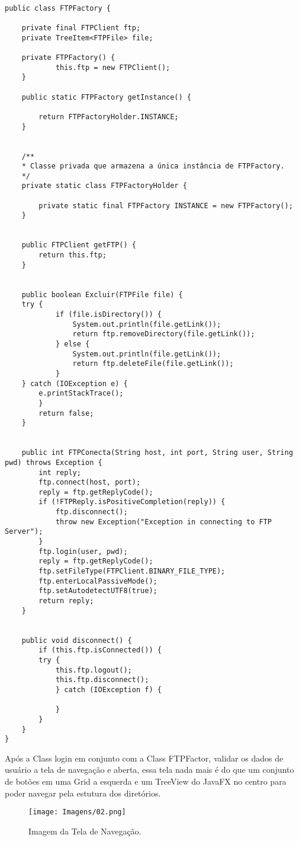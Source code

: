 \documentclass[12pt]{article}
\begin{document}
\begin{lstlisting}

public class FTPFactory {
	
	private final FTPClient ftp;
	private TreeItem<FTPFile> file;
		
	private FTPFactory() {
			this.ftp = new FTPClient();
	}
	
	public static FTPFactory getInstance() {
	
		return FTPFactoryHolder.INSTANCE;
	}


	/**
	* Classe privada que armazena a única instância de FTPFactory.
	*/
	private static class FTPFactoryHolder {
	
		private static final FTPFactory INSTANCE = new FTPFactory();
	}


	public FTPClient getFTP() {
		return this.ftp;
	}


	public boolean Excluir(FTPFile file) {
	try {
			if (file.isDirectory()) {
				System.out.println(file.getLink());
				return ftp.removeDirectory(file.getLink());
			} else {
				System.out.println(file.getLink());
				return ftp.deleteFile(file.getLink());
			}
	} catch (IOException e) {
		e.printStackTrace();
		}	
		return false;
	}


	public int FTPConecta(String host, int port, String user, String pwd) throws Exception {
		int reply;
		ftp.connect(host, port);
		reply = ftp.getReplyCode();
		if (!FTPReply.isPositiveCompletion(reply)) {
			ftp.disconnect();
			throw new Exception("Exception in connecting to FTP Server");
		}
		ftp.login(user, pwd);
		reply = ftp.getReplyCode();
		ftp.setFileType(FTPClient.BINARY_FILE_TYPE);
		ftp.enterLocalPassiveMode();
		ftp.setAutodetectUTF8(true);
		return reply;
	}


	public void disconnect() {
		if (this.ftp.isConnected()) {
		try {
			this.ftp.logout();
			this.ftp.disconnect();
			} catch (IOException f) {
	
			}
	    }
	}
}	

\end{lstlisting}

Após a Class login em conjunto com a Class FTPFactor, validar os dados de usuário a tela de navegação e aberta, essa tela nada mais é do que um conjunto de botões em uma Grid a esquerda e um TreeView do JavaFX no centro para poder navegar pela estutura dos diretórios.

\begin{figure}[H]
	\centering
	\texttt{[image: Imagens/02.png]}
	\caption{ Imagem da Tela de Navegação.}
	\label{fig:01}
\end{figure}
\end{document}

